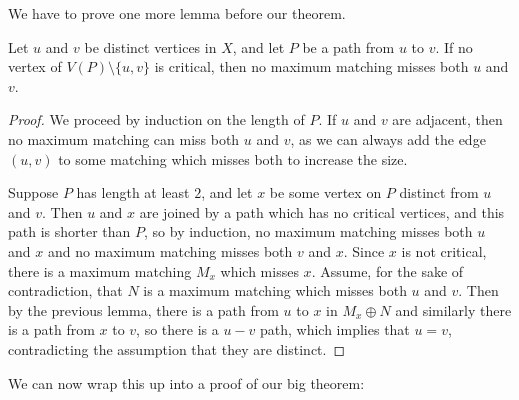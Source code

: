 We have to prove one more lemma before our theorem.


\begin{lemma}
	Let $u$ and $v$ be distinct vertices in $X$, and let $P$ be a path from $u$ to $v$.  If no vertex of $V(P)\setminus\{u,v\}$ is critical, then no maximum matching misses both $u$ and $v$.
\end{lemma}
\begin{proof}
	
	We proceed by induction on the length of $P$.  If $u$ and $v$ are adjacent, then no maximum matching can miss both $u$ and $v$, as we can always add the edge $(u,v)$ to some matching which misses both to increase the size.
	
	Suppose $P$ has length at least $2$, and let $x$ be some vertex on $P$ distinct from $u$ and $v$.  Then $u$ and $x$ are joined by a path which has no critical vertices, and this path is shorter than $P$, so by induction, no maximum matching misses both $u$ and $x$ and no maximum matching misses both $v$ and $x$.  Since $x$ is not critical, there is a maximum matching $M_x$ which misses $x$.  Assume, for the sake of contradiction, that $N$ is a maximum matching which misses both $u$ and $v$.  Then by the previous lemma, there is a path from $u$ to $x$ in $M_x\oplus N$ and similarly there is a path from $x$ to $v$, so there is a $u{-}v$ path, which implies that $u=v$, contradicting the assumption that they are distinct.
	
	
	
\end{proof}

We can  now wrap this up into a proof of our big theorem:

